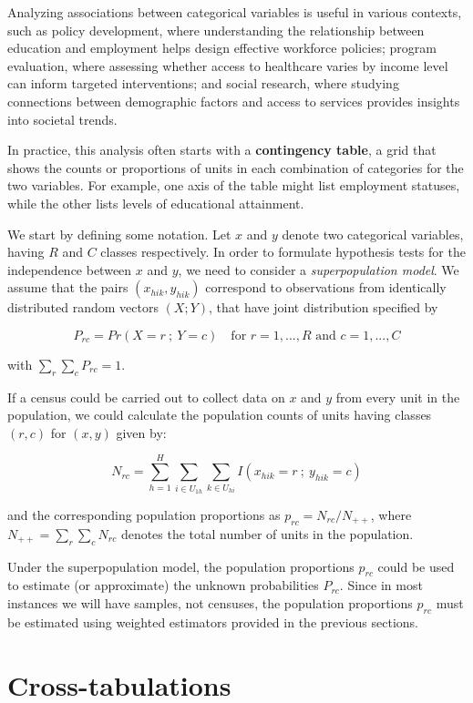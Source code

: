 \documentclass[
  12pt,
]{book}
\begin{document}
Analyzing associations between categorical variables is useful in various contexts, such as policy development, where understanding the relationship between education and employment helps design effective workforce policies; program evaluation, where assessing whether access to healthcare varies by income level can inform targeted interventions; and social research, where studying connections between demographic factors and access to services provides insights into societal trends.

In practice, this analysis often starts with a \textbf{contingency table}, a grid that shows the counts or proportions of units in each combination of categories for the two variables. For example, one axis of the table might list employment statuses, while the other lists levels of educational attainment.

We start by defining some notation. Let \(x\) and \(y\) denote two categorical variables, having \(R\) and \(C\) classes respectively. In order to formulate hypothesis tests for the independence between \(x\) and \(y\), we need to consider a \emph{superpopulation model}. We assume that the pairs \((x_{hik} , y_{hik})\) correspond to observations from identically distributed random vectors \((X ; Y)\), that have joint distribution specified by

\[
P_{rc} = Pr \left( X = r \ ; \ Y = c \right) \quad \text{for } r=1,...,R \text{ and } c=1,...,C
\]

with \(\sum_r \sum_c P_{rc} = 1\).

If a census could be carried out to collect data on \(x\) and \(y\) from every unit in the population, we could calculate the population counts of units having classes \((r,c)\) for \((x,y)\) given by:

\[
N_{rc} = \sum_{h=1}^H \sum_{i \in U_{1h}} \sum_{k \in U_{hi}} I \left( x_{hik} = r \ ; \ y_{hik} = c \right)
\]

and the corresponding population proportions as \(p_{rc} = N_{rc} / N_{++}\), where \(N_{++} = \sum_r \sum_c N_{rc}\) denotes the total number of units in the population.

Under the superpopulation model, the population proportions \(p_{rc}\) could be used to estimate (or approximate) the unknown probabilities \(P_{rc}\). Since in most instances we will have samples, not censuses, the population proportions \(p_{rc}\) must be estimated using weighted estimators provided in the previous sections.

\hypertarget{cross-tabulations}{%
\section{Cross-tabulations}\label{cross-tabulations}}
\end{document}
